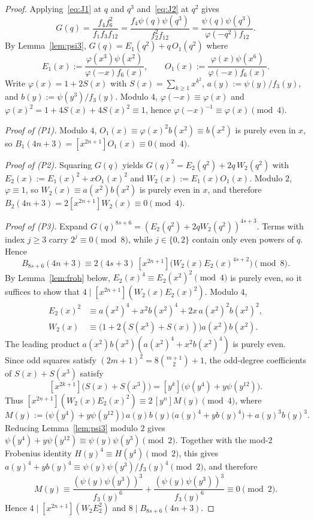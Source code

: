 \documentclass[11pt]{article}
\begin{document}
\begin{proof}
Applying~\eqref{eq:J1} at $q$ and $q^3$ and~\eqref{eq:J2} at $q^2$ gives
\[
G(q) = \frac{f_4 f_6^2}{f_1 f_3 f_{12}} = \frac{f_4 \psi(q)\psi(q^3)}{f_2^2 f_{12}} = \frac{\psi(q)\psi(q^3)}{\varphi(-q^2) f_{12}}.
\]
By Lemma~\ref{lem:psi3}, $G(q) = E_1(q^2) + q\, O_1(q^2)$ where
\[
E_1(x) := \frac{\varphi(x^3)\psi(x^2)}{\varphi(-x)f_6(x)}, \qquad O_1(x) := \frac{\varphi(x)\psi(x^6)}{\varphi(-x)f_6(x)}.
\]
Write $\varphi(x) = 1 + 2S(x)$ with $S(x) = \sum_{k \ge 1} x^{k^2}$, $a(y) := \psi(y)/f_3(y)$, and $b(y) := \psi(y^3)/f_3(y)$. Modulo $4$, $\varphi(-x) \equiv \varphi(x)$ and $\varphi(x)^2 = 1 + 4S(x) + 4S(x)^2 \equiv 1$, hence $\varphi(-x)^{-1} \equiv \varphi(x) \pmod 4$.

\emph{Proof of (P1).} Modulo $4$, $O_1(x) \equiv \varphi(x)^2 b(x^2) \equiv b(x^2)$ is purely even in $x$, so $B_1(4n+3) = [x^{2n+1}]O_1(x) \equiv 0 \pmod 4$.

\emph{Proof of (P2).} Squaring $G(q)$ yields $G(q)^2 = E_2(q^2) + 2q\, W_2(q^2)$ with $E_2(x) := E_1(x)^2 + x O_1(x)^2$ and $W_2(x) := E_1(x)O_1(x)$. Modulo $2$, $\varphi \equiv 1$, so $W_2(x) \equiv a(x^2)b(x^2)$ is purely even in $x$, and therefore $B_2(4n+3) = 2[x^{2n+1}]W_2(x) \equiv 0 \pmod 4$.

\emph{Proof of (P3).} Expand $G(q)^{8s+6} = (E_2(q^2) + 2q W_2(q^2))^{4s+3}$. Terms with index $j \ge 3$ carry $2^j \equiv 0 \pmod 8$, while $j \in \{0, 2\}$ contain only even powers of $q$. Hence
\[
B_{8s+6}(4n+3) \equiv 2(4s+3)\,[x^{2n+1}]\bigl(W_2(x) E_2(x)^{4s+2}\bigr) \pmod 8.
\]
By Lemma~\ref{lem:frob} below, $E_2(x)^4 \equiv E_2(x^2)^2 \pmod 4$ is purely even, so it suffices to show that $4 \mid [x^{2n+1}](W_2(x)E_2(x)^2)$. Modulo $4$,
\begin{align*}
E_2(x)^2 &\equiv a(x^2)^4 + x^2 b(x^2)^4 + 2x\, a(x^2)^2 b(x^2)^2, \\
W_2(x) &\equiv \bigl(1 + 2(S(x^3) + S(x))\bigr) a(x^2) b(x^2).
\end{align*}
The leading product $a(x^2)b(x^2)(a(x^2)^4 + x^2 b(x^2)^4)$ is purely even. Since odd squares satisfy $(2m+1)^2 = 8\binom{m+1}{2} + 1$, the odd-degree coefficients of $S(x) + S(x^3)$ satisfy
\[
[x^{2k+1}]\bigl(S(x) + S(x^3)\bigr) = [y^k]\bigl(\psi(y^4) + y\psi(y^{12})\bigr).
\]
Thus $[x^{2n+1}](W_2(x)E_2(x)^2) \equiv 2\,[y^n] M(y) \pmod 4$, where
\[
M(y) := \bigl(\psi(y^4) + y\psi(y^{12})\bigr)\, a(y)b(y)\bigl(a(y)^4 + y b(y)^4\bigr) + a(y)^3 b(y)^3.
\]
Reducing Lemma~\ref{lem:psi3} modulo $2$ gives $\psi(y^4) + y\psi(y^{12}) \equiv \psi(y)\psi(y^3) \pmod 2$. Together with the mod-$2$ Frobenius identity $H(y)^4 \equiv H(y^4) \pmod 2$, this gives $a(y)^4 + yb(y)^4 \equiv \psi(y)\psi(y^3)/f_3(y)^4 \pmod 2$, and therefore
\[
M(y) \equiv \frac{(\psi(y)\psi(y^3))^3}{f_3(y)^6} + \frac{(\psi(y)\psi(y^3))^3}{f_3(y)^6} \equiv 0 \pmod 2.
\]
Hence $4 \mid [x^{2n+1}](W_2 E_2^2)$ and $8 \mid B_{8s+6}(4n+3)$.
\end{proof}
\end{document}
